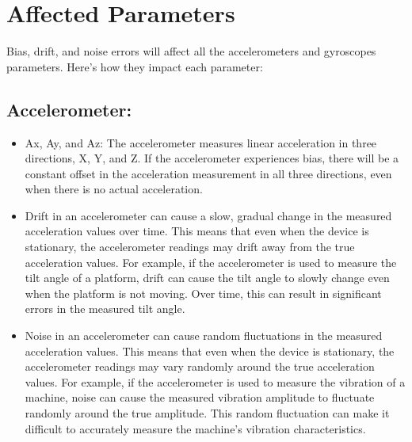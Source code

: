 \section{Affected Parameters}
Bias, drift, and noise errors will affect all the accelerometers and gyroscopes parameters. Here's how they impact each parameter:\newpage

\subsection{Accelerometer:}
\begin{itemize}
    \item Ax, Ay, and Az: The accelerometer measures linear acceleration in three directions, X, Y, and Z. If the accelerometer experiences bias, there will be a constant offset in the acceleration measurement in all three directions, even when there is no actual acceleration. 
    \item Drift in an accelerometer can cause a slow, gradual change in the measured acceleration values over time. This means that even when the device is stationary, the accelerometer readings may drift away from the true acceleration values. For example, if the accelerometer is used to measure the tilt angle of a platform, drift can cause the tilt angle to slowly change even when the platform is not moving. Over time, this can result in significant errors in the measured tilt angle.
    \item Noise in an accelerometer can cause random fluctuations in the measured acceleration values. This means that even when the device is stationary, the accelerometer readings may vary randomly around the true acceleration values. For example, if the accelerometer is used to measure the vibration of a machine, noise can cause the measured vibration amplitude to fluctuate randomly around the true amplitude. This random fluctuation can make it difficult to accurately measure the machine's vibration characteristics.
\end{itemize}

